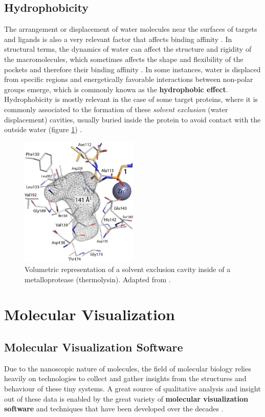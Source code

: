   \subsection{Hydrophobicity}
    The arrangement or displacement of water molecules near the surfaces of targets and ligands is also a very relevant factor that affects binding affinity \cite{hydrophobic_2017, hydrophobic_2022}. In structural terms, the dynamics of water can affect the structure and rigidity of the macromolecules, which sometimes affects the shape and flexibility of the pockets and therefore their binding affinity \cite{hydrophobic_2022}. In some instances, water is displaced from specific regions and energetically favorable interactions between non-polar groups emerge, which is commonly known as the \textbf{hydrophobic effect}. Hydrophobicity is mostly relevant in the case of some target proteins, where it is commonly associated to the formation of these \textit{solvent exclusion} (water displacement) cavities, usually buried inside the protein to avoid contact with the outside water (figure \ref{fig:intro/hydrophobic}) \cite{hydrophobic_2017}.

    \begin{figure}[H]
      \centering
      \includegraphics[width=0.5\textwidth]{figures/intro/hydrophobic.png}
      \caption{\label{fig:intro/hydrophobic} Volumetric representation of a solvent exclusion cavity inside of a metalloprotease (thermolysin). Adapted from \cite{hydrophobic_2017}.}
    \end{figure}


\section{Molecular Visualization}
  \subsection{Molecular Visualization Software}
    Due to the nanoscopic nature of molecules, the field of molecular biology relies heavily on technologies to collect and gather insights from the structures and behaviour of these tiny systems. A great source of qualitative analysis and insight out of these data is enabled by the great variety of \textbf{molecular visualization software} and techniques that have been developed over the decades \cite{visualization_2018}.

